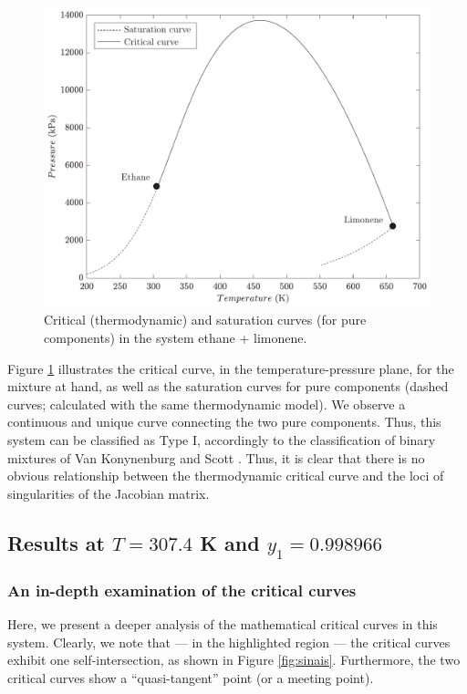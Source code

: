 \documentclass[journal=iecred,manuscript=article]{achemso}
\theoremstyle{definition}
\theoremstyle{remark}
\begin{document}
\begin{figure}
	\begin{center}
		\includegraphics[scale=0.50]{curva_critica_saturacao.pdf}
		\caption{Critical (thermodynamic) and saturation curves (for pure components) in the system ethane + limonene.}\label{fig:critical_thermo}
	\end{center}
\end{figure}

Figure \ref{fig:critical_thermo} illustrates the critical curve, in the temperature-pressure plane, for the mixture at hand, as well as the saturation curves for pure components (dashed curves; calculated with the same thermodynamic model). We observe a continuous and unique curve connecting the two pure components. Thus, this system can be classified as Type I, accordingly to the classification of binary mixtures of Van Konynenburg and Scott \cite{classif}. Thus, it is clear that there is no obvious relationship between the thermodynamic critical curve and the loci of singularities of the Jacobian matrix.

\subsection{Results at $T = 307.4 $ K and $y_1 = 0.998966$}

\subsubsection{An in-depth examination of the critical curves}

Here, we present a deeper analysis of the mathematical critical curves in this system. Clearly, we note that --- in the highlighted region --- the critical curves exhibit one self-intersection, as shown in Figure \ref{fig:sinais}. Furthermore, the two critical curves show a \enquote{quasi-tangent} point (or a meeting point).
\end{document}
